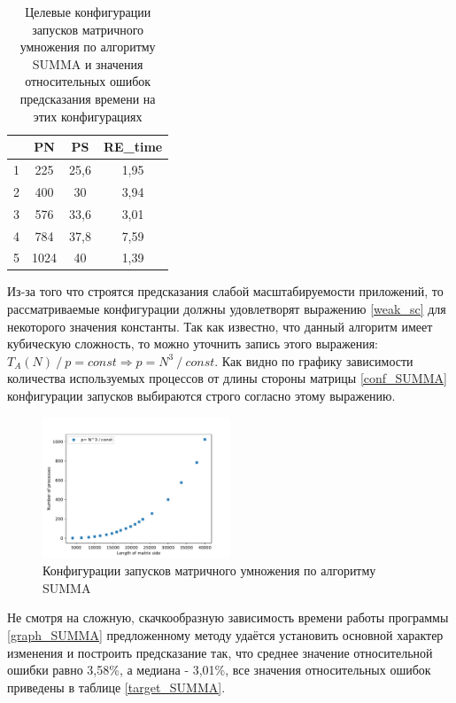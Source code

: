 		\begin{table}
			\centering
			\begin{tabular}{|r|c|c|c|}
			\hline
			\textnumero & PN   & PS   & RE\_time        \\ \hline
			1           & 225  & 25,6 & 1,95            \\ \hline
			2           & 400  & 30   & 3,94            \\ \hline
			3           & 576  & 33,6 & 3,01            \\ \hline
			4           & 784  & 37,8 & 7,59            \\ \hline
			5           & 1024 & 40   & 1,39            \\ \hline
			\end{tabular}
			\caption{Целевые конфигурации запусков матричного умножения по алгоритму SUMMA и значения относительных ошибок предсказания времени на этих конфигурациях}
			\label{target_SUMMA}
		\end{table}
		Из-за того что строятся предсказания слабой масштабируемости приложений, то рассматриваемые конфигурации должны удовлетворят выражению \eqref{weak_sc} для некоторого значения константы. Так как известно, что данный алгоритм имеет кубическую сложность, то можно уточнить запись этого выражения: \(T_A(N)\:/\:p = const \Rightarrow p = N^3\:/\:const\). Как видно по графику зависимости количества используемых процессов от длины стороны матрицы \eqref{conf_SUMMA} конфигурации запусков выбираются строго согласно этому выражению.

		\begin{figure}
			\centering
			\includegraphics[width=0.5\textwidth]{./images/conf_SUMMA}
			\caption{Конфигурации запусков матричного умножения по алгоритму SUMMA}
			\label{conf_SUMMA}
		\end{figure}

		Не смотря на сложную, скачкообразную зависимость времени работы программы \eqref{graph_SUMMA} предложенному методу удаётся установить основной характер изменения и построить предсказание так, что среднее значение относительной ошибки равно 3,58\%, а медиана - 3,01\%, все значения относительных ошибок приведены в таблице \eqref{target_SUMMA}.

